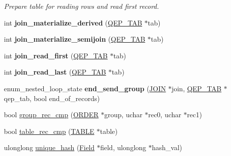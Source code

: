 \begin{DoxyCompactItemize}
\begin{DoxyCompactList}\small\item\em Prepare table for reading rows and read first record. \end{DoxyCompactList}\item 
\mbox{\label{group__Query__Executor_gaacfded5a6c9ce5c5bb279b9c993b0abc}} 
int {\bfseries join\+\_\+materialize\+\_\+derived} (\mbox{\hyperlink{classQEP__TAB}{Q\+E\+P\+\_\+\+T\+AB}} $\ast$tab)
\item 
\mbox{\label{group__Query__Executor_ga65ca6da89564963ba3ecf8928c6fbe39}} 
int {\bfseries join\+\_\+materialize\+\_\+semijoin} (\mbox{\hyperlink{classQEP__TAB}{Q\+E\+P\+\_\+\+T\+AB}} $\ast$tab)
\item 
\mbox{\label{group__Query__Executor_gab44c4ace769049e98d1b391d2918ecb9}} 
int {\bfseries join\+\_\+read\+\_\+first} (\mbox{\hyperlink{classQEP__TAB}{Q\+E\+P\+\_\+\+T\+AB}} $\ast$tab)
\item 
\mbox{\label{group__Query__Executor_gabd0f901c4d15cfc0dc61c7c3dc12cee5}} 
int {\bfseries join\+\_\+read\+\_\+last} (\mbox{\hyperlink{classQEP__TAB}{Q\+E\+P\+\_\+\+T\+AB}} $\ast$tab)
\item 
\mbox{\label{group__Query__Executor_gaf3f237e84d9f550f9b30b62e9cc34a69}} 
enum\+\_\+nested\+\_\+loop\+\_\+state {\bfseries end\+\_\+send\+\_\+group} (\mbox{\hyperlink{classJOIN}{J\+O\+IN}} $\ast$join, \mbox{\hyperlink{classQEP__TAB}{Q\+E\+P\+\_\+\+T\+AB}} $\ast$qep\+\_\+tab, bool end\+\_\+of\+\_\+records)
\item 
bool \mbox{\hyperlink{group__Query__Executor_gaa74e832cc92e35fa5e94c664b367dcad}{group\+\_\+rec\+\_\+cmp}} (\mbox{\hyperlink{structst__order}{O\+R\+D\+ER}} $\ast$group, uchar $\ast$rec0, uchar $\ast$rec1)
\item 
bool \mbox{\hyperlink{group__Query__Executor_gabf5c3ba6e3e4cec96f452e9d2ca5bf9a}{table\+\_\+rec\+\_\+cmp}} (\mbox{\hyperlink{structTABLE}{T\+A\+B\+LE}} $\ast$table)
\item 
ulonglong \mbox{\hyperlink{group__Query__Executor_ga161ae3fce537993456b85fe09b4c3d89}{unique\+\_\+hash}} (\mbox{\hyperlink{classField}{Field}} $\ast$field, ulonglong $\ast$hash\+\_\+val)
\item 

\end{DoxyCompactItemize}
